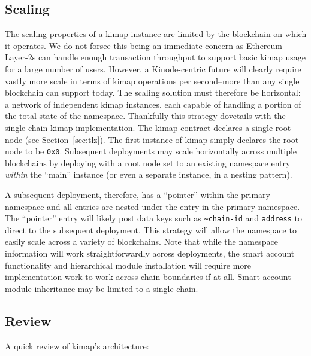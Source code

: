\documentclass[runningheads]{llncs}
\begin{document}
\subsection{Scaling}

The scaling properties of a kimap instance are limited by the blockchain on which it operates.
We do not forsee this being an immediate concern as Ethereum Layer-2s can handle enough transaction throughput to support basic kimap usage for a large number of users.
However, a Kinode-centric future will clearly require vastly more scale in terms of kimap operations per second–more than any single blockchain can support today.
The scaling solution must therefore be horizontal: a network of independent kimap instances, each capable of handling a portion of the total state of the namespace.
Thankfully this strategy dovetails with the single-chain kimap implementation.
The kimap contract declares a single root node (see Section~\ref{sec:tlz}).
The first instance of kimap simply declares the root node to be \verb|0x0|.
Subsequent deployments may scale horizontally across multiple blockchains by deploying with a root node set to an existing namespace entry \textit{within} the ``main'' instance (or even a separate instance, in a nesting pattern).

A subsequent deployment, therefore, has a ``pointer'' within the primary namespace and all entries are nested under the entry in the primary namespace.
The ``pointer'' entry will likely post data keys such as \verb|~chain-id| and \verb|address| to direct to the subsequent deployment.
This strategy will allow the namespace to easily scale across a variety of blockchains.
Note that while the namespace information will work straightforwardly across deployments, the smart account functionality and hierarchical module installation will require more implementation work to work across chain boundaries if at all.
Smart account module inheritance may be limited to a single chain.

\subsection{Review}
\label{sec:kimapreview}

A quick review of kimap's architecture:
\end{document}
